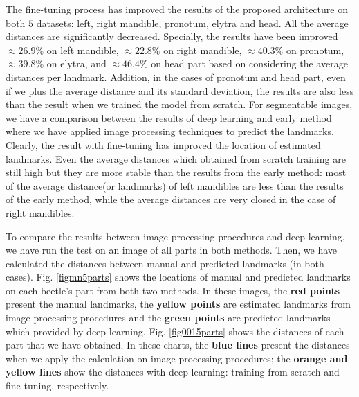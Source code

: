 \documentclass[review]{elsarticle}
\begin{document}
The fine-tuning process has improved the results of the proposed architecture on both $5$ datasets: left, right mandible, pronotum, elytra and head. All the average distances are significantly decreased. Specially, the results have been improved $\approx 26.9\%$ on left mandible, $\approx 22.8\%$ on right mandible, $\approx 40.3\%$ on pronotum, $\approx 39.8\%$ on elytra, and $\approx 46.4\%$  on head part based on considering the average distances per landmark. Addition, in the cases of pronotum and head part, even if we plus the average distance and its standard deviation, the results are also less than the result when we trained the model from scratch. For segmentable images, we have a comparison between the results of deep learning and early method where we have applied image processing techniques to predict the landmarks. Clearly, the result with fine-tuning has improved the location of estimated landmarks. Even the average distances which obtained from scratch training are still high but they are more stable than the results from the early method: most of the average distance(or landmarks) of left mandibles are less than the results of the early method, while the average distances are very closed in the case of right mandibles.

To compare the results between image processing procedures and deep learning, we have run the test on an image of all parts in both methods. Then, we have calculated the distances between manual and predicted landmarks (in both cases). Fig. \ref{figmn5parts} shows the locations of manual and predicted landmarks on each beetle's part from both two methods. In these images, the \textbf{red points} present the manual landmarks, the \textbf{yellow points} are estimated landmarks from image processing procedures and the \textbf{green points} are predicted landmarks which provided by deep learning. Fig. \ref{fig0015parts} shows the distances of each part that we have obtained. In these charts, the \textbf{blue lines} present the distances when we apply the calculation on image processing procedures; the \textbf{orange and yellow lines} show the distances with deep learning: training from scratch and fine tuning, respectively.
\end{document}
